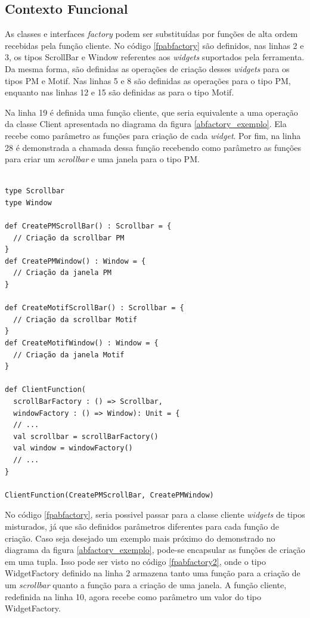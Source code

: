 \subsection*{Contexto Funcional}

As classes e interfaces \textit{factory} podem 
ser substituídas por funções de alta ordem 
recebidas pela função cliente. 
No código \ref{fpabfactory} são definidos, 
nas linhas 2 e 3,  
os tipos ScrollBar e Window referentes aos 
\textit{widgets} suportados pela ferramenta. 
Da mesma forma, são definidas as operações de 
criação desses \textit{widgets} para os tipos 
PM e Motif. Nas linhas 5 e 8 são definidas as 
operações para o tipo PM, enquanto nas linhas 
12 e 15 são definidas as para o tipo Motif. 

Na linha 19 é definida uma função cliente, 
que seria equivalente a uma operação da classe 
Client apresentada no diagrama da figura 
\ref{abfactory_exemplo}. Ela 
recebe como parâmetro as funções para criação de 
cada \textit{widget}. Por fim, na linha 28 é 
demonstrada a chamada dessa função recebendo 
como parâmetro as funções para criar um 
\textit{scrollbar} e uma janela para o tipo 
PM.

\begin{lstlisting}[caption={Abstract Factory Funcional},label=fpabfactory]
    
type Scrollbar
type Window

def CreatePMScrollBar() : Scrollbar = {
  // Criação da scrollbar PM
}
def CreatePMWindow() : Window = {
  // Criação da janela PM
}

def CreateMotifScrollBar() : Scrollbar = {
  // Criação da scrollbar Motif
}
def CreateMotifWindow() : Window = {
  // Criação da janela Motif
}

def ClientFunction(
  scrollBarFactory : () => Scrollbar, 
  windowFactory : () => Window): Unit = {
  // ...
  val scrollbar = scrollBarFactory()
  val window = windowFactory()
  // ...
}

ClientFunction(CreatePMScrollBar, CreatePMWindow)

\end{lstlisting}

No código \ref{fpabfactory}, seria possivel passar 
para a classe cliente \textit{widgets} de tipos 
misturados, já que são definidos parâmetros 
diferentes para cada função de criação. Caso 
seja desejado um exemplo mais próximo do demonstrado 
no diagrama da figura \ref{abfactory_exemplo}, 
pode-se encapsular as funções de criação 
em uma tupla. Isso pode ser visto no código 
\ref{fpabfactory2}, onde o tipo WidgetFactory 
definido na linha 2 armazena tanto uma função 
para a criação de um \textit{scrollbar} quanto a função 
para a criação de uma janela. A função 
cliente, redefinida na linha 10, agora 
recebe como parâmetro um valor do tipo 
WidgetFactory.

